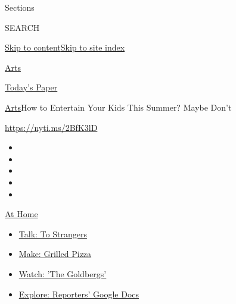 Sections

SEARCH

\protect\hyperlink{site-content}{Skip to
content}\protect\hyperlink{site-index}{Skip to site index}

\href{https://www.nytimes3xbfgragh.onion/section/arts}{Arts}

\href{https://myaccount.nytimes3xbfgragh.onion/auth/login?response_type=cookie\&client_id=vi}{}

\href{https://www.nytimes3xbfgragh.onion/section/todayspaper}{Today's
Paper}

\href{/section/arts}{Arts}\textbar{}How to Entertain Your Kids This
Summer? Maybe Don't

\href{https://nyti.ms/2BfK3lD}{https://nyti.ms/2BfK3lD}

\begin{itemize}
\item
\item
\item
\item
\item
\end{itemize}

\href{https://www.nytimes3xbfgragh.onion/spotlight/at-home?action=click\&pgtype=Article\&state=default\&region=TOP_BANNER\&context=at_home_menu}{At
Home}

\begin{itemize}
\tightlist
\item
  \href{https://www.nytimes3xbfgragh.onion/2020/08/03/well/family/the-benefits-of-talking-to-strangers.html?action=click\&pgtype=Article\&state=default\&region=TOP_BANNER\&context=at_home_menu}{Talk:
  To Strangers}
\item
  \href{https://www.nytimes3xbfgragh.onion/2020/08/01/at-home/coronavirus-make-pizza-on-a-grill.html?action=click\&pgtype=Article\&state=default\&region=TOP_BANNER\&context=at_home_menu}{Make:
  Grilled Pizza}
\item
  \href{https://www.nytimes3xbfgragh.onion/2020/07/31/arts/television/goldbergs-abc-stream.html?action=click\&pgtype=Article\&state=default\&region=TOP_BANNER\&context=at_home_menu}{Watch:
  'The Goldbergs'}
\item
  \href{https://www.nytimes3xbfgragh.onion/interactive/2020/at-home/even-more-reporters-editors-diaries-lists-recommendations.html?action=click\&pgtype=Article\&state=default\&region=TOP_BANNER\&context=at_home_menu}{Explore:
  Reporters' Google Docs}
\end{itemize}

